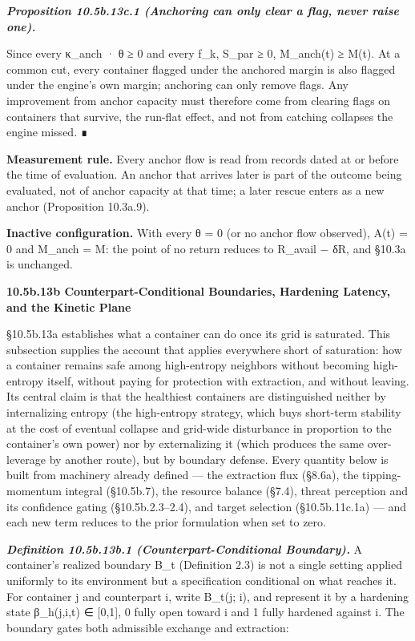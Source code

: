 \documentclass[
]{article}
\begin{document}
\emph{\textbf{Proposition 10.5b.13c.1 (Anchoring can only clear a flag,
never raise one).}}

Since every κ\_anch · θ ≥ 0 and every f\_k, S\_par ≥ 0, M\_anch(t) ≥
M(t). At a common cut, every container flagged under the anchored margin
is also flagged under the engine's own margin; anchoring can only remove
flags. Any improvement from anchor capacity must therefore come from
clearing flags on containers that survive, the run-flat effect, and not
from catching collapses the engine missed. ∎

\textbf{Measurement rule.} Every anchor flow is read from records dated
at or before the time of evaluation. An anchor that arrives later is
part of the outcome being evaluated, not of anchor capacity at that
time; a later rescue enters as a new anchor (Proposition 10.3a.9).

\textbf{Inactive configuration.} With every θ = 0 (or no anchor flow
observed), A(t) = 0 and M\_anch = M: the point of no return reduces to
R\_avail − δR, and §10.3a is unchanged.

\textbf{10.5b.13b Counterpart-Conditional Boundaries, Hardening Latency,
and the Kinetic Plane}

§10.5b.13a establishes what a container can do once its grid is
saturated. This subsection supplies the account that applies everywhere
short of saturation: how a container remains safe among high-entropy
neighbors without becoming high-entropy itself, without paying for
protection with extraction, and without leaving. Its central claim is
that the healthiest containers are distinguished neither by
internalizing entropy (the high-entropy strategy, which buys short-term
stability at the cost of eventual collapse and grid-wide disturbance in
proportion to the container's own power) nor by externalizing it (which
produces the same over-leverage by another route), but by boundary
defense. Every quantity below is built from machinery already defined
--- the extraction flux (§8.6a), the tipping-momentum integral
(§10.5b.7), the resource balance (§7.4), threat perception and its
confidence gating (§10.5b.2.3--2.4), and target selection
(§10.5b.11c.1a) --- and each new term reduces to the prior formulation
when set to zero.

\emph{\textbf{Definition 10.5b.13b.1 (Counterpart-Conditional
Boundary).}} A container's realized boundary B\_t (Definition 2.3) is
not a single setting applied uniformly to its environment but a
specification conditional on what reaches it. For container j and
counterpart i, write B\_t(j; i), and represent it by a hardening state
β\_h(j,i,t) ∈ {[}0,1{]}, 0 fully open toward i and 1 fully hardened
against i. The boundary gates both admissible exchange and extraction:
\end{document}
